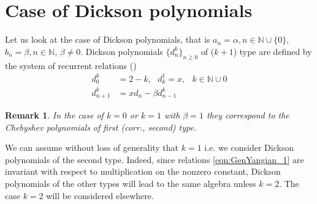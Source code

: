 \documentclass[10pt]{article}%
\numberwithin{equation}{section}
\newtheorem{rem}[thm]{Remark}
\begin{document}
\section{Case of Dickson polynomials}\label{sec:Chebyshev}
Let us look at the case of Dickson polynomials, that is $a_n=\alpha,n\in\mathbb{N}\cup\{0\}$, $b_n=\beta,n\in\mathbb{N}$, $\beta\neq 0$. Dickson polynomials $\{d_n^k\}_{n\geq 0}$ of ($k+1$) type are defined by the system of recurrent relations (\cite{WY2012,Stoll2008})
\[
\begin{array}{cc}
    d_0^k &= 2-k,\,\,\,\, d_k^1=x,\,\,\,\ k\in\mathbb{N}\cup {0} \\
    d_{n+1}^k &= x d_n -\beta d_{n-1}^k
\end{array}
\]
\begin{rem}
 In the case of $k=0$ or $k=1$ with $\beta=1$ they correspond to the Chebyshev polynomials of first (corr., second) type.   
\end{rem}
 We can assume without loss of generality that $k=1$ i.e. we consider Dickson polynomials of  the second type. Indeed, since relations  \eqref{eqn:GenYangian_1} are invariant with respect to multiplication on the nonzero constant, Dickson polynomials of the other types will lead to the same algebra unless $k=2$. The case $k=2$ will be considered elsewhere.
\end{document}
